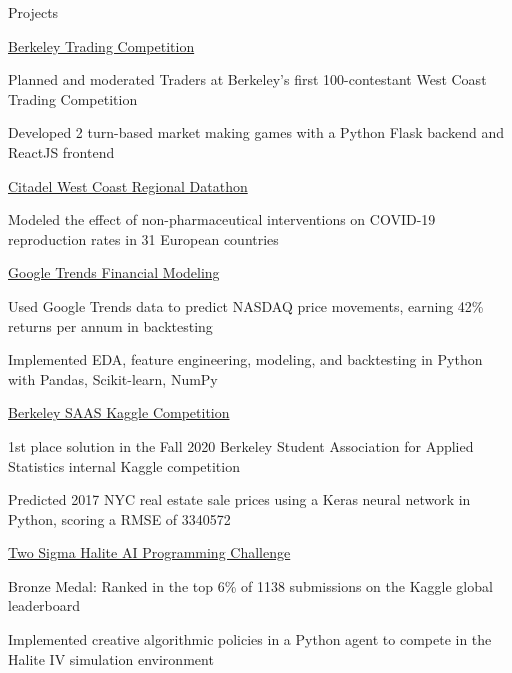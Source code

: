 \documentclass{resume} %
\begin{document}

\begin{rSection}{Projects}

\begin{rSubsection}{\href{https://traders.berkeley.edu/}{Berkeley Trading Competition}}{}{}{}
    \item Planned and moderated Traders at Berkeley's first 100-contestant West Coast Trading Competition
    \item Developed 2 turn-based market making games with a Python Flask backend and ReactJS frontend 
\end{rSubsection}

\begin{rSubsection}{\href{https://github.com/evilpegasus/datathon-spring-2021}{Citadel West Coast Regional Datathon}}{}{}{}
    \item Modeled the effect of non-pharmaceutical interventions on COVID-19 reproduction rates in 31 European countries
\end{rSubsection}

\begin{rSubsection}{\href{https://github.com/evilpegasus/google-trends-financial-modeling/}{Google Trends Financial Modeling}}{}{}{}
    \item Used Google Trends data to predict NASDAQ price movements, earning 42\% returns per annum in backtesting
    \item Implemented EDA, feature engineering, modeling, and backtesting in Python with Pandas, Scikit-learn, NumPy
\end{rSubsection}

\begin{rSubsection}{\href{https://www.kaggle.com/c/saas-2020-fall-cx-kaggle-compeition/}{Berkeley SAAS Kaggle Competition}}{}{}{}
    \item 1st place solution in the Fall 2020 Berkeley Student Association for Applied Statistics internal Kaggle competition
    \item Predicted 2017 NYC real estate sale prices using a Keras neural network in Python, scoring a RMSE of 3340572
\end{rSubsection}

\begin{rSubsection}{\href{https://www.kaggle.com/c/halite/}{Two Sigma Halite AI Programming Challenge}}{}{}{}
    \item Bronze Medal: Ranked in the top 6\% of 1138 submissions on the Kaggle global leaderboard
    \item Implemented creative algorithmic policies in a Python agent to compete in the Halite IV simulation environment
\end{rSubsection}


\end{rSection}
\end{document}
